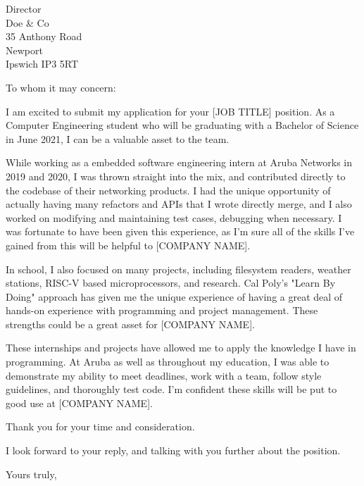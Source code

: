\documentclass{letter}
\begin{document}
	
	\begin{letter}{Director \\ Doe \& Co \\ 35 Anthony Road
			\\ Newport \\ Ipswich IP3 5RT}
		\opening{To whom it may concern:}
		
		I am excited to submit my application for your [JOB TITLE] position. As a Computer Engineering student who will be graduating with a Bachelor of Science in June 2021, I can be a valuable asset to the team.
		
		While working as a embedded software engineering intern at Aruba Networks in 2019 and 2020, I was thrown straight into the mix, and contributed directly to the codebase of their networking products. I had the unique opportunity of actually having many refactors and APIs that I wrote directly merge, and I also worked on modifying and maintaining test cases, debugging when necessary. I was fortunate to have been given this experience, as I'm sure all of the skills I've gained from this will be helpful to [COMPANY NAME].
		
		In school, I also focused on many projects, including filesystem readers, weather stations, RISC-V based microprocessors, and research. Cal Poly's "Learn By Doing" approach has given me the unique experience of having a great deal of hands-on experience with programming and project management. These strengths could be a great asset for [COMPANY NAME].
		
		These internships and projects have allowed me to apply the knowledge I have in programming. At Aruba as well as throughout my education, I was able to demonstrate my ability to meet deadlines, work with a team, follow style guidelines, and thoroughly test code. I'm confident these skills will be put to good use at [COMPANY NAME].
		
		Thank you for your time and consideration.
		
		I look forward to your reply, and talking with you further about the position.
		
		\closing{Yours truly,}
		
	\end{letter}
\end{document}
